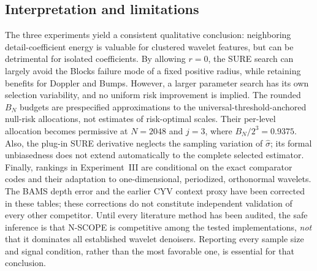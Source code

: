 \subsection{Interpretation and limitations}
\label{sec:simul-discussion}

The three experiments yield a consistent qualitative conclusion:
neighboring detail-coefficient energy is valuable for clustered wavelet
features, but can be detrimental for isolated coefficients. By
allowing $r=0$, the SURE search can largely avoid the Blocks failure
mode of a fixed positive radius, while retaining benefits for Doppler
and Bumps. However, a larger parameter search has its own selection
variability, and no uniform risk improvement is implied.
The rounded $B_N$ budgets are prespecified approximations to the
universal-threshold-anchored null-risk allocations, not estimates of
risk-optimal scales. Their per-level allocation becomes permissive at
$N=2048$ and $j=3$, where $B_N/2^3=0.9375$. Also, the plug-in SURE derivative neglects the
sampling variation of $\widehat\sigma$; its formal unbiasedness does
not extend automatically to the complete selected estimator.
Finally, rankings in Experiment~III are conditional on the exact
comparator codes and their adaptation to one-dimensional, periodized,
orthonormal wavelets.
The BAMS depth error and the earlier CYV context proxy have been
corrected in these tables; these corrections do not constitute
independent validation of every other competitor. Until every literature method has been audited,
the safe inference is that N-SCOPE is competitive among the tested
implementations, \emph{not} that it dominates all established
wavelet denoisers. Reporting every sample size and signal condition,
rather than the most favorable one, is essential for that conclusion.
